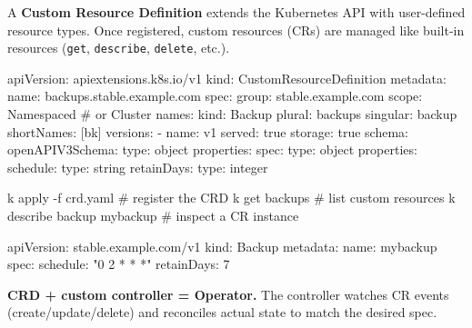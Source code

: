 \begin{tcbitemize}[
  raster columns=2, raster equal height=rows,
  blanker, cheat subtitle
]

\tcbitem

  {\fontsize{6.5}{7.5}\selectfont\sffamily
  A \textbf{Custom Resource Definition} extends the Kubernetes API with
  user-defined resource types. Once registered, custom resources (CRs) are
  managed like built-in resources (\texttt{get}, \texttt{describe},
  \texttt{delete}, etc.).\par}

  \begin{cheatcodeyaml}
apiVersion: apiextensions.k8s.io/v1
kind: CustomResourceDefinition
metadata:
  name: backups.stable.example.com
spec:
  group: stable.example.com
  scope: Namespaced              # or Cluster
  names:
    kind: Backup
    plural: backups
    singular: backup
    shortNames: [bk]
  versions:
  - name: v1
    served: true
    storage: true
    schema:
      openAPIV3Schema:
        type: object
        properties:
          spec:
            type: object
            properties:
              schedule:
                type: string
              retainDays:
                type: integer
  \end{cheatcodeyaml}

  \begin{cheatcodebash}
k apply -f crd.yaml            # register the CRD
k get backups                  # list custom resources
k describe backup mybackup     # inspect a CR instance
  \end{cheatcodebash}

  \begin{cheatcodeyaml}
apiVersion: stable.example.com/v1
kind: Backup
metadata:
  name: mybackup
spec:
  schedule: "0 2 * * *"
  retainDays: 7
  \end{cheatcodeyaml}


\tcbitem

  {\fontsize{6.5}{7.5}\selectfont\sffamily
  \textbf{CRD + custom controller = Operator.}
  The controller watches CR events (create/update/delete) and reconciles
  actual state to match the desired spec.\par}


\end{tcbitemize}
